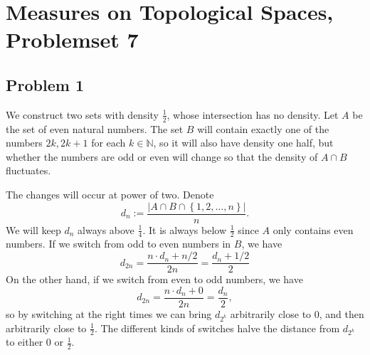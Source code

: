 \chapter{Measures on Topological Spaces, Problemset 7}

\section*{Problem 1}

We construct two sets with density \( \frac{1}{2} \), whose intersection has no density. Let \( A \) be the set of even natural numbers. The set \( B \) will contain exactly one of the numbers \( 2k, 2k + 1 \) for each \( k \in \mathbb{N} \), so it will also have density one half, but whether the numbers are odd or even will change so that the density of \( A \cap B \) fluctuates.

The changes will occur at power of two. Denote
\[ 
    d_n := \frac{ \left| A \cap B \cap \left\{ 1, 2, \ldots, n \right\} \right|  }{n}. 
\]
We will keep \( d_n \) always above \( \frac{1}{4} \). It is always below \( \frac{1}{2} \) since \( A \) only contains even numbers. If we switch from odd to even numbers in \( B \), we have
\[ 
    d_{2n} = \frac{n \cdot d_n + n/2}{2n} = \frac{d_n + 1/2}{2}
\]
On the other hand, if we switch from even to odd numbers, we have
\[ 
    d_{2n} = \frac{n \cdot d_n + 0}{2n} = \frac{d_n}{2},
\]
so by switching at the right times we can bring \( d_{2^k} \) arbitrarily close to \( 0 \), and then arbitrarily close to \( \frac{1}{2} \). The different kinds of switches halve the distance from \( d_{2^k} \) to either \( 0 \) or \( \frac{1}{2} \).
